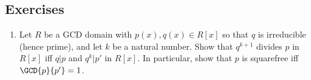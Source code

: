 \documentclass{article}
\begin{document}
\subsection*{Exercises}

\begin{enumerate}
\item Let $R$ be a GCD domain with $p(x), q(x) \in R[x]$ so that $q$ is irreducible (hence prime), and let $k$ be a natural number. Show that $q^{k+1}$ divides $p$ in $R[x]$ iff $q|p$ and $q^k|p'$ in $R[x]$. In particular, show that $p$ is squarefree iff $\GCD{p}{p'} = 1$. 
\end{enumerate}
\end{document}
